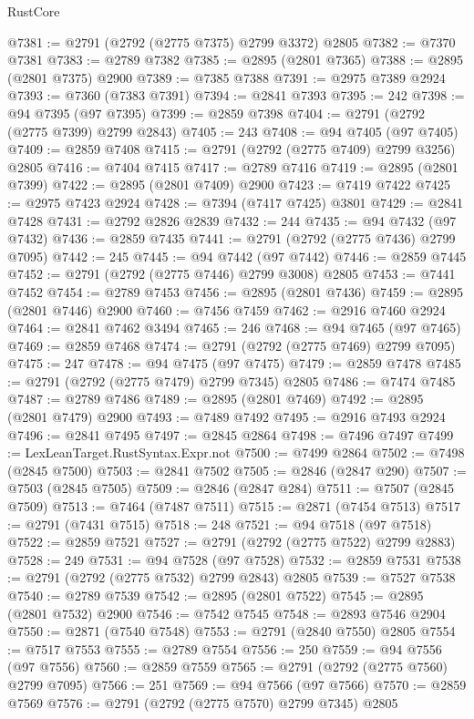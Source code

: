 \begin{lexlean}{RustCore}
\begin{coremodule}
@7381 := @2791 (@2792 (@2775 @7375) @2799 @3372) @2805
@7382 := @7370 @7381
@7383 := @2789 @7382
@7385 := @2895 (@2801 @7365)
@7388 := @2895 (@2801 @7375) @2900
@7389 := @7385 @7388
@7391 := @2975 @7389 @2924
@7393 := @7360 (@7383 @7391)
@7394 := @2841 @7393
@7395 := 242
@7398 := @94 @7395 (@97 @7395)
@7399 := @2859 @7398
@7404 := @2791 (@2792 (@2775 @7399) @2799 @2843)
@7405 := 243
@7408 := @94 @7405 (@97 @7405)
@7409 := @2859 @7408
@7415 := @2791 (@2792 (@2775 @7409) @2799 @3256) @2805
@7416 := @7404 @7415
@7417 := @2789 @7416
@7419 := @2895 (@2801 @7399)
@7422 := @2895 (@2801 @7409) @2900
@7423 := @7419 @7422
@7425 := @2975 @7423 @2924
@7428 := @7394 (@7417 @7425) @3801
@7429 := @2841 @7428
@7431 := @2792 @2826 @2839
@7432 := 244
@7435 := @94 @7432 (@97 @7432)
@7436 := @2859 @7435
@7441 := @2791 (@2792 (@2775 @7436) @2799 @7095)
@7442 := 245
@7445 := @94 @7442 (@97 @7442)
@7446 := @2859 @7445
@7452 := @2791 (@2792 (@2775 @7446) @2799 @3008) @2805
@7453 := @7441 @7452
@7454 := @2789 @7453
@7456 := @2895 (@2801 @7436)
@7459 := @2895 (@2801 @7446) @2900
@7460 := @7456 @7459
@7462 := @2916 @7460 @2924
@7464 := @2841 @7462 @3494
@7465 := 246
@7468 := @94 @7465 (@97 @7465)
@7469 := @2859 @7468
@7474 := @2791 (@2792 (@2775 @7469) @2799 @7095)
@7475 := 247
@7478 := @94 @7475 (@97 @7475)
@7479 := @2859 @7478
@7485 := @2791 (@2792 (@2775 @7479) @2799 @7345) @2805
@7486 := @7474 @7485
@7487 := @2789 @7486
@7489 := @2895 (@2801 @7469)
@7492 := @2895 (@2801 @7479) @2900
@7493 := @7489 @7492
@7495 := @2916 @7493 @2924
@7496 := @2841 @7495
@7497 := @2845 @2864
@7498 := @7496 @7497
@7499 := LexLeanTarget.RustSyntax.Expr.not
@7500 := @7499 @2864
@7502 := @7498 (@2845 @7500)
@7503 := @2841 @7502
@7505 := @2846 (@2847 @290)
@7507 := @7503 (@2845 @7505)
@7509 := @2846 (@2847 @284)
@7511 := @7507 (@2845 @7509)
@7513 := @7464 (@7487 @7511)
@7515 := @2871 (@7454 @7513)
@7517 := @2791 (@7431 @7515)
@7518 := 248
@7521 := @94 @7518 (@97 @7518)
@7522 := @2859 @7521
@7527 := @2791 (@2792 (@2775 @7522) @2799 @2883)
@7528 := 249
@7531 := @94 @7528 (@97 @7528)
@7532 := @2859 @7531
@7538 := @2791 (@2792 (@2775 @7532) @2799 @2843) @2805
@7539 := @7527 @7538
@7540 := @2789 @7539
@7542 := @2895 (@2801 @7522)
@7545 := @2895 (@2801 @7532) @2900
@7546 := @7542 @7545
@7548 := @2893 @7546 @2904
@7550 := @2871 (@7540 @7548)
@7553 := @2791 (@2840 @7550) @2805
@7554 := @7517 @7553
@7555 := @2789 @7554
@7556 := 250
@7559 := @94 @7556 (@97 @7556)
@7560 := @2859 @7559
@7565 := @2791 (@2792 (@2775 @7560) @2799 @7095)
@7566 := 251
@7569 := @94 @7566 (@97 @7566)
@7570 := @2859 @7569
@7576 := @2791 (@2792 (@2775 @7570) @2799 @7345) @2805

\end{coremodule}
\end{lexlean}
